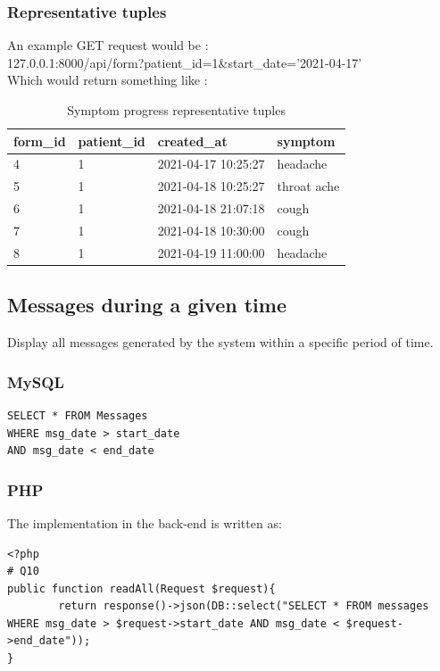 \documentclass{article}
\begin{document}
\subsubsection{Representative tuples}
An example GET request would be : \\
127.0.0.1:8000/api/form?patient\_id=1\&start\_date='2021-04-17'\\
Which would return something like :
\begin{table}[ht]
\centering
\begin{tabular}{|l|l|l|l|} 
        \hline
        form\_id & patient\_id & created\_at & symptom \\
        \hline 
        4&1& 2021-04-17 10:25:27 & headache\\
        5&1 & 2021-04-18 10:25:27 & throat ache\\
        6&1 & 2021-04-18 21:07:18 & cough\\
        7&1 & 2021-04-18 10:30:00 & cough\\
        8&1 & 2021-04-19 11:00:00 & headache\\
        \hline
\end{tabular}
\caption{Symptom progress representative tuples}
\end{table}
\subsection{Messages during a given time} 
Display all messages generated by the system within a specific period of time.

\subsubsection{MySQL}
\begin{verbatim}
SELECT * FROM Messages 
WHERE msg_date > start_date 
AND msg_date < end_date
\end{verbatim}

\subsubsection{PHP}
The implementation in the back-end is written as:
\begin{verbatim}
<?php
# Q10
public function readAll(Request $request){
        return response()->json(DB::select("SELECT * FROM messages WHERE msg_date > $request->start_date AND msg_date < $request->end_date"));
}

\end{verbatim}
\end{document}
